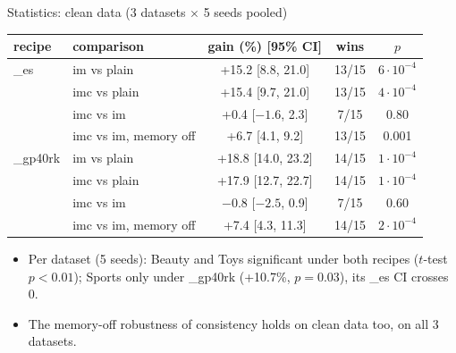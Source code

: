 \documentclass{beamer}
\newcommand{\up}[1]{\textcolor{green!45!black}{#1}}
\begin{document}
\begin{frame}{Statistics: clean data (3 datasets $\times$ 5 seeds pooled)}
\centering
\footnotesize
\setlength{\tabcolsep}{4pt}
\begin{tabular}{llccc}
\toprule
recipe & comparison & gain (\%) [95\% CI] & wins & $p$ \\
\midrule
\_es     & im vs plain            & \up{+15.2} [8.8, 21.0]  & 13/15 & $6\cdot10^{-4}$ \\
         & imc vs plain           & \up{+15.4} [9.7, 21.0]  & 13/15 & $4\cdot10^{-4}$ \\
         & imc vs im              & +0.4 [$-1.6$, 2.3]      & 7/15  & 0.80 \\
         & imc vs im, memory off  & \up{+6.7} [4.1, 9.2]    & 13/15 & 0.001 \\
\midrule
\_gp40rk & im vs plain            & \up{+18.8} [14.0, 23.2] & 14/15 & $1\cdot10^{-4}$ \\
         & imc vs plain           & \up{+17.9} [12.7, 22.7] & 14/15 & $1\cdot10^{-4}$ \\
         & imc vs im              & $-0.8$ [$-2.5$, 0.9]    & 7/15  & 0.60 \\
         & imc vs im, memory off  & \up{+7.4} [4.3, 11.3]   & 14/15 & $2\cdot10^{-4}$ \\
\bottomrule
\end{tabular}

\medskip
\begin{itemize}\footnotesize
  \item Per dataset (5 seeds): Beauty and Toys significant under both
        recipes ($t$-test $p<0.01$); Sports only under \_gp40rk
        (+10.7\%, $p=0.03$), its \_es CI crosses 0.
  \item The memory-off robustness of consistency holds on clean data too,
        on all 3 datasets.
\end{itemize}
\end{frame}
\end{document}
